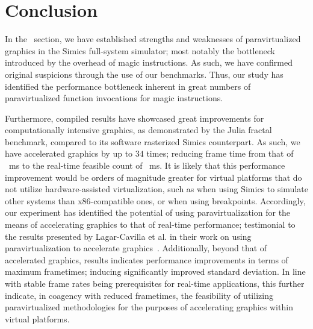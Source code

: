 
\section{Conclusion}
\label{sec:conclusion}
In the ~section, we have established strengths and weaknesses of paravirtualized graphics in the Simics full-system simulator; most notably the bottleneck introduced by the overhead of magic instructions.
As such, we have confirmed original suspicions through the use of our benchmarks.
Thus, our study has identified the performance bottleneck inherent in great numbers of paravirtualized function invocations for magic instructions.

Furthermore, compiled results have showcased great improvements for computationally intensive graphics, as demonstrated by the Julia fractal benchmark, compared to its software rasterized Simics counterpart.
As such, we have accelerated graphics by up to $34$ times; reducing frame time from that of ~ms to the real-time feasible count of ~ms.
It is likely that this performance improvement would be orders of magnitude greater for virtual platforms that do not utilize hardware-assisted virtualization, such as when using Simics to simulate other systems than x86-compatible ones, or when using breakpoints.
Accordingly, our experiment has identified the potential of using paravirtualization for the means of accelerating graphics to that of real-time performance; testimonial to the results presented by Lagar-Cavilla et al. in their work on using paravirtualization to accelerate graphics~.
Additionally, beyond that of accelerated graphics, results indicates performance improvements in terms of maximum frametimes; inducing significantly improved standard deviation.
In line with stable frame rates being prerequisites for real-time applications, this further indicate, in coagency with reduced frametimes, the feasibility of utilizing paravirtualized methodologies for the purposes of accelerating graphics within virtual platforms.

